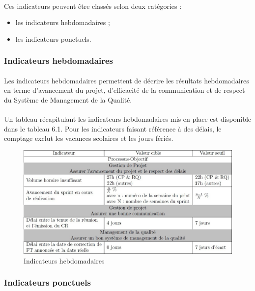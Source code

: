 \paragraph*{} Ces indicateurs peuvent être classés selon deux catégories :
\begin{itemize} 
	\item les indicateurs hebdomadaires ;
	\item les indicateurs ponctuels.
 \end{itemize}

\subsubsection*{Indicateurs hebdomadaires}
\label{Indicateurs hebdomadaires}
\paragraph*{} Les indicateurs hebdomadaires permettent de décrire les résultats hebdomadaires en terme
d'avancement du projet, d'efficacité de la communication et de respect du Système de Management de la Qualité.

\paragraph*{} Un tableau récapitulant les indicateurs hebdomadaires mis en place est disponible dans le
tableau 6.1. Pour les indicateurs faisant référence à des délais, le comptage exclut les vacances
scolaires et les jours fériés.
\begin{figure}[h]
   \center
   \caption{\label{Tableau 6.1} Indicateurs hebdomadaires}
   \includegraphics[width=13cm]{./images/indicateurs_hebdomadaires.jpg}
\end{figure}

\subsubsection*{Indicateurs ponctuels}
\label{Indicateurs ponctuels}
